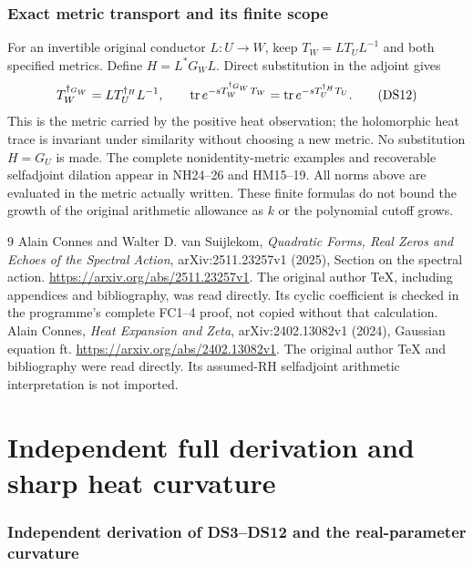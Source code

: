 \documentclass[11pt]{article}
\begin{document}
\section{Exact metric transport and its finite scope}
For an invertible original conductor \(L:U\to W\), keep
\(T_W=LT_UL^{-1}\) and both specified metrics. Define
\(H=L^*G_WL\). Direct substitution in the adjoint gives
\[
 T_W^{\dagger_{G_W}}=L T_U^{\dagger_H}L^{-1},\qquad
 \operatorname{tr} e^{-sT_W^{\dagger_{G_W}}T_W}
 =\operatorname{tr} e^{-sT_U^{\dagger_H}T_U}.
 \tag{DS12}
\]
This is the metric carried by the positive heat observation; the
holomorphic heat trace is invariant under similarity without choosing
a new metric. No substitution \(H=G_U\) is made. The complete
nonidentity-metric examples and recoverable selfadjoint dilation appear
in NH24--26 and HM15--19. All norms above are evaluated in the metric
actually written. These finite formulas do not bound the growth of the
original arithmetic allowance as \(k\) or the polynomial cutoff grows.

\begin{thebibliography}{9}
 Alain Connes and Walter D. van Suijlekom,
\emph{Quadratic Forms, Real Zeros and Echoes of the Spectral Action},
arXiv:2511.23257v1 (2025), Section on the spectral action.
\url{https://arxiv.org/abs/2511.23257v1}.
The original author TeX, including appendices and bibliography, was
read directly. Its cyclic coefficient is checked in the programme's
complete FC1--4 proof, not copied without that calculation.
 Alain Connes, \emph{Heat Expansion and Zeta},
arXiv:2402.13082v1 (2024), Gaussian equation ft.
\url{https://arxiv.org/abs/2402.13082v1}.
The original author TeX and bibliography were read directly.
Its assumed-RH selfadjoint arithmetic interpretation is not imported.
\end{thebibliography}

\endgroup

\clearpage\begingroup
\part*{Independent full derivation and sharp heat curvature}
\providecommand{\nhitightlist}{\setlength{\itemsep}{0pt}\setlength{\parskip}{0pt}}
\providecommand{\nhipassthrough}[1]{#1}

\section{Independent derivation of DS3--DS12 and the real-parameter curvature}\label{nhi:independent-derivation-of-ds3ds12-and-the-real-parameter-curvature}
\end{document}
